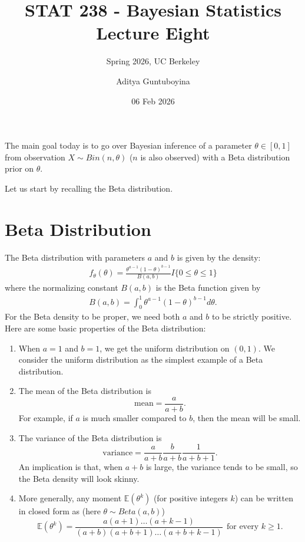 \documentclass{scrartcl}
\newcommand{\E}{{\mathbb E}}
\begin{document}
\title{STAT 238 - Bayesian Statistics  \\
  Lecture Eight} 
\subtitle{Spring 2026, UC Berkeley}

\author{Aditya Guntuboyina}


\date{06 Feb 2026}

\maketitle

The main goal today is to go over Bayesian inference of a parameter $\theta
\in [0, 1]$ from observation $X \sim Bin(n, \theta)$ ($n$ is also
observed) with a Beta distribution prior on $\theta$.

Let us start by recalling the Beta distribution. 

\section{Beta Distribution}
The Beta distribution with parameters $a$ and $b$ is given by the
density: 
\begin{align*}
  f_{\theta}(\theta) = \frac{\theta^{a-1} (1 - \theta)^{b-1}}{B(a, b)} I\{0
  \leq \theta \leq 1\}
\end{align*}
where the normalizing constant $B(a, b)$ is the Beta function given by
\begin{align*}
  B(a, b) = \int_0^1 \theta^{a-1} (1 - \theta)^{b-1} d\theta. 
\end{align*}
For the Beta density to be proper, we need both $a$ and $b$ to be
strictly positive. Here are some basic properties of the Beta
distribution:
\begin{enumerate}
\item When $a = 1$ and $b = 1$, we get the uniform distribution on
  $(0, 1)$. We consider the uniform distribution as the simplest
  example of a Beta distribution.
\item The mean of the Beta distribution is
  \begin{equation*}
    \text{mean} = \frac{a}{a + b}. 
  \end{equation*}
  For example, if $a$ is much smaller compared to $b$, then
  the mean will be small. 
\item The variance of the Beta distribution is
  \begin{equation*}
    \text{variance} = \frac{a}{a + b}
    \frac{b}{a + b} \frac{1}{a + b + 1}. 
  \end{equation*}
 An implication is that, when $a + b$ is large, the variance
 tends to be small, so the Beta density will look skinny.
\item More generally, any moment $\E (\theta^k)$  (for positive integers $k$)
  can be written in closed form as (here $\theta \sim Beta(a, b)$)
  \begin{equation*}
    \E (\theta^k) = \frac{a(a + 1) \dots (a +
      k-1)}{(a + b) (a + b + 1) \dots (a +
      b + k - 1)} ~~ \text{for every $k \geq 1$}. 
  \end{equation*}
\end{enumerate}
\end{document}
